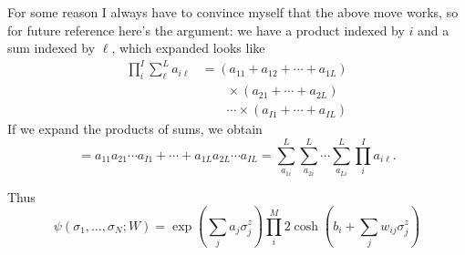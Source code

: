 \documentclass{report}
\begin{document}
\begin{thinnamedbox}[Note]
For some reason I always have to convince myself that the above move works, 
so for future reference here's the argument: we have a product indexed by 
$ i $ and a sum indexed by $ \ell $, which expanded looks like
\begin{align*}
	\prod_i^I \sum_\ell^L a_{i\ell}
		&= (a_{11} + a_{12} + \cdots + a_{1L})\\[-1em]
		&\qquad \times (a_{21} + \cdots + a_{2L})\\
		&\qquad \cdots \times (a_{I1} + \cdots + a_{IL})
\end{align*}
If we expand the products of sums, we obtain 
\begin{equation*}
	= a_{11} a_{21}\cdots a_{I1} + \cdots + a_{1L} a_{2L} \cdots a_{IL}
	= \sum_{a_{1i}}^L
	 \sum_{a_{2i}}^L \cdots
	 \sum_{a_{Li}}^L 
	 \prod_i^I a_{i\ell}.
\end{equation*}

\end{thinnamedbox}

Thus 
\begin{equation*}
	\psi(\sigma_1, \dots, \sigma_N; W)
	= 
	\exp\left(\sum_j a_j \sigma_j^z \right)
	\prod_i^M 2\cosh\left(b_i +\sum_{j} w_{ij} \sigma_j^z\right)
\end{equation*}
\end{document}
